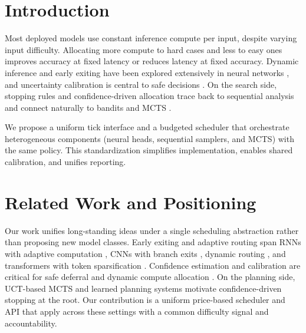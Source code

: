 \section{Introduction}
Most deployed models use constant inference compute per input, despite varying input difficulty. Allocating more compute to hard cases and less to easy ones improves accuracy at fixed latency or reduces latency at fixed accuracy. Dynamic inference and early exiting have been explored extensively in neural networks \cite{Graves2016ACT,Teerapittayanon2016BranchyNet,Huang2018MSDNet,Wang2018SkipNet,Kaya2019ShallowDeep,Xin2020DeeBERT,Liu2020FastBERT,Elbayad2020DepthAdaptive,NiculescuMizil2005Calib,Figurnov2017SACT,Bolukbasi2017Adaptive,Cai2020OFA,Xiao2021DynamicViT,Ryoo2021TokenLearner,Yu2019Slimmable,Guo2017Calibration}, and uncertainty calibration is central to safe decisions \cite{Guo2017Calibration,Kendall2017Uncertainty,Gal2016DropoutBayes,Platt1999}. On the search side, stopping rules and confidence-driven allocation trace back to sequential analysis \cite{Wald1945Sequential,Hoeffding1963} and connect naturally to bandits and MCTS \cite{Kocsis2006UCT,Coulom2006MCTS,Silver2017AlphaZero,Schrittwieser2020MuZero,LattimoreSzepesvari2020,Kalyanakrishnan2012PAC,Anthony2017ThinkingFast}. 

We propose a uniform tick interface and a budgeted scheduler that orchestrate heterogeneous components (neural heads, sequential samplers, and MCTS) with the same policy. This standardization simplifies implementation, enables shared calibration, and unifies reporting.

\section{Related Work and Positioning}
Our work unifies long-standing ideas under a single scheduling abstraction rather than proposing new model classes. Early exiting and adaptive routing span RNNs with adaptive computation \cite{Graves2016ACT}, CNNs with branch exits \cite{Teerapittayanon2016BranchyNet,Huang2018MSDNet,Bolukbasi2017Adaptive}, dynamic routing \cite{Wang2018SkipNet}, and transformers with token sparsification \cite{Xin2020DeeBERT,Liu2020FastBERT,Elbayad2020DepthAdaptive,Xiao2021DynamicViT,Ryoo2021TokenLearner,Yu2019Slimmable}. Confidence estimation and calibration are critical for safe deferral and dynamic compute allocation \cite{Guo2017Calibration,NiculescuMizil2005Calib,Platt1999,Kendall2017Uncertainty,Gal2016DropoutBayes}. On the planning side, UCT-based MCTS \cite{Kocsis2006UCT,Coulom2006MCTS} and learned planning systems \cite{Silver2017AlphaZero,Schrittwieser2020MuZero} motivate confidence-driven stopping at the root. Our contribution is a uniform price-based scheduler and API that apply across these settings with a common difficulty signal and accountability.

